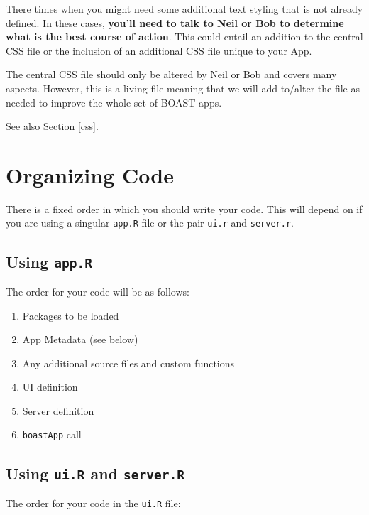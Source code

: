 \documentclass[
]{book}
\providecommand{\tightlist}{%
  \setlength{\itemsep}{0pt}\setlength{\parskip}{0pt}}
\begin{document}
There times when you might need some additional text styling that is not already defined. In these cases, \textbf{you'll need to talk to Neil or Bob to determine what is the best course of action}. This could entail an addition to the central CSS file or the inclusion of an additional CSS file unique to your App.

The central CSS file should only be altered by Neil or Bob and covers many aspects. However, this is a living file meaning that we will add to/alter the file as needed to improve the whole set of BOAST apps.

See also \protect\hyperlink{css}{Section \ref{css}}.

\hypertarget{orgCode}{%
\section{Organizing Code}\label{orgCode}}

There is a fixed order in which you should write your code. This will depend on if you are using a singular \texttt{app.R} file or the pair \texttt{ui.r} and \texttt{server.r}.

\hypertarget{using-app.r}{%
\subsection{\texorpdfstring{Using \texttt{app.R}}{Using app.R}}\label{using-app.r}}

The order for your code will be as follows:

\begin{enumerate}
\def\labelenumi{\arabic{enumi}.}
\tightlist
\item
  Packages to be loaded
\item
  App Metadata (see below)
\item
  Any additional source files and custom functions
\item
  UI definition
\item
  Server definition
\item
  \texttt{boastApp} call
\end{enumerate}

\hypertarget{using-ui.r-and-server.r}{%
\subsection{\texorpdfstring{Using \texttt{ui.R} and \texttt{server.R}}{Using ui.R and server.R}}\label{using-ui.r-and-server.r}}

The order for your code in the \texttt{ui.R} file:
\end{document}
